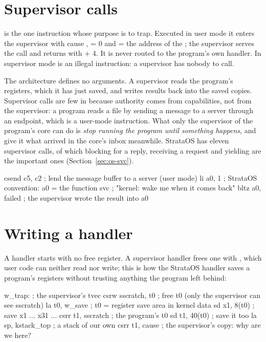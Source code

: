 \section{Supervisor calls}\label{sec:svc}

 is the one instruction whose purpose is to trap. Executed in user mode it enters the
supervisor with cause ,  = 0 and  = the address of the ; the
supervisor serves the call and returns with  + 4. It is never routed to the program's own
handler. In supervisor mode  is an illegal instruction: a supervisor has nobody to call.

The architecture defines no arguments. A supervisor reads the program's registers, which it has just
saved, and writes results back into the saved copies. Supervisor calls are few in \IS because
authority comes from capabilities, not from the supervisor: a program reads a file by sending a message
to a server through an endpoint, which is a user-mode instruction. What only the supervisor of the
program's core can do is \emph{stop running the program until something happens}, and give it what
arrived in the core's inbox meanwhile. StrataOS has eleven supervisor calls, of which blocking for a
reply, receiving a request and yielding are the important ones (Section~\ref{sec:os-svc}).

\begin{asm}
        csend c5, c2                    ; lend the message buffer to a server (user mode)
        li    a0, 1                     ; StrataOS convention: a0 = the function
        svc                             ; "kernel: wake me when it comes back"
        bltz  a0, failed                ; the supervisor wrote the result into a0
\end{asm}

\section{Writing a handler}

A handler starts with no free register. A supervisor handler frees one with , which user
code can neither read nor write; this is how the StrataOS handler saves a program's registers without
trusting anything the program left behind:

\begin{asm}
w_trap:                                 ; the supervisor's tvec
        csrw  sscratch, t0              ; free t0 (only the supervisor can see sscratch)
        la    t0, w_save                ; t0 = register save area in kernel data
        sd    x1, 8(t0)                 ; save x1 ... x31
        ...
        csrr  t1, sscratch              ; the program's t0
        sd    t1, 40(t0)                ; save it too
        la    sp, kstack_top            ; a stack of our own
        csrr  t1, cause                 ; the supervisor's copy: why are we here?
\end{asm}

